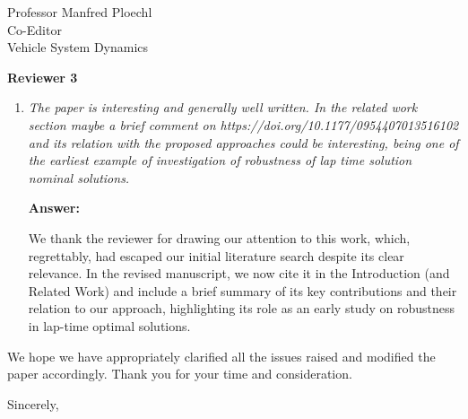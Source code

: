 \documentclass{letter}
\begin{document}
\begin{letter}{Professor Manfred Ploechl\\
Co-Editor\\
Vehicle System Dynamics}
\begin{enumerate}
\hrulefill

\end{enumerate}

\textbf{Reviewer 3}

\begin{enumerate}

\item
\textit{The paper is interesting and generally well written. In the related work section maybe a brief comment on https://doi.org/10.1177/0954407013516102 and its relation with the proposed approaches could be interesting, being one of the earliest example of investigation of robustness of lap time solution nominal solutions.}

\vspace{2mm}

\textbf{Answer:}

We thank the reviewer for drawing our attention to this work, which, regrettably, had escaped our initial literature search despite its clear relevance. In the revised manuscript, we now cite it in the Introduction (and Related Work) and include a brief summary of its key contributions and their relation to our approach, highlighting its role as an early study on robustness in lap-time optimal solutions.

\hrulefill

\end{enumerate}

We hope we have appropriately clarified all the issues raised and modified the paper accordingly. Thank you for your time and consideration.


\vspace{2\parskip} %
\closing{Sincerely,}
\vspace{2\parskip} %



\end{letter}
\end{document}
